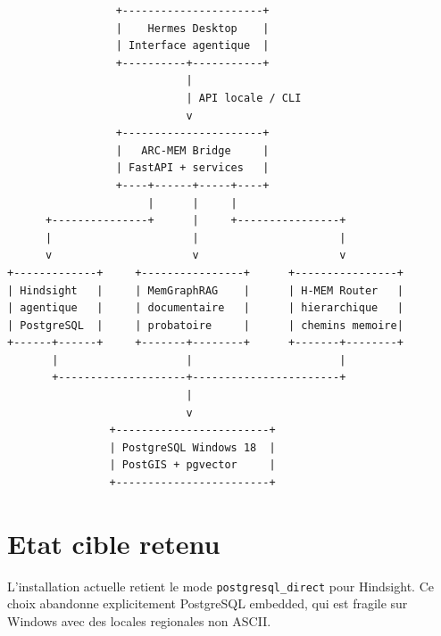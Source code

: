 \documentclass[11pt,a4paper]{article}
\begin{document}
\begin{verbatim}
                 +----------------------+
                 |    Hermes Desktop    |
                 | Interface agentique  |
                 +----------+-----------+
                            |
                            | API locale / CLI
                            v
                 +----------------------+
                 |   ARC-MEM Bridge     |
                 | FastAPI + services   |
                 +----+------+-----+----+
                      |      |     |
      +---------------+      |     +----------------+
      |                      |                      |
      v                      v                      v
+-------------+     +----------------+      +----------------+
| Hindsight   |     | MemGraphRAG    |      | H-MEM Router   |
| agentique   |     | documentaire   |      | hierarchique   |
| PostgreSQL  |     | probatoire     |      | chemins memoire|
+------+------+     +-------+--------+      +-------+--------+
       |                    |                       |
       +--------------------+-----------------------+
                            |
                            v
                +------------------------+
                | PostgreSQL Windows 18  |
                | PostGIS + pgvector     |
                +------------------------+
\end{verbatim}

\section{Etat cible retenu}

L'installation actuelle retient le mode \texttt{postgresql\_direct} pour Hindsight.
Ce choix abandonne explicitement PostgreSQL embedded, qui est fragile sur Windows
avec des locales regionales non ASCII.
\end{document}

